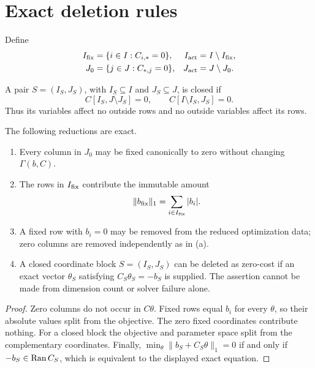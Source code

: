 \section{Exact deletion rules}
\label{sec:deletion}

Define
\begin{align*}
 I_{\rm fix}
 &=
 \{i\in I:C_{i,*}=0\},&
 I_{\rm act}
 &=
 I\setminus I_{\rm fix},\\
 J_0
 &=
 \{j\in J:C_{*,j}=0\},&
 J_{\rm act}
 &=
 J\setminus J_0.
\end{align*}

\begin{definition}
A pair \(S=(I_S,J_S)\), with \(I_S\subseteq I\) and
\(J_S\subseteq J\), is closed if
\[
 C[I_S,J\setminus J_S]=0,
 \qquad
 C[I\setminus I_S,J_S]=0.
\]
Thus its variables affect no outside rows and no outside variables
affect its rows.
\end{definition}

\begin{theorem}
\label{thm:deletion}
The following reductions are exact.
\begin{enumerate}[label=\textup{(\alph*)},leftmargin=2.5em]
 \item Every column in \(J_0\) may be fixed canonically to zero without
       changing \(\Gamma(b,C)\).
 \item The rows in \(I_{\rm fix}\) contribute the immutable amount
       \[
       \|b_{\rm fix}\|_1
       =
       \sum_{i\in I_{\rm fix}}|b_i|.
       \]
 \item A fixed row with \(b_i=0\) may be removed from the reduced
       optimization data; zero columns are removed independently as in
       \textup{(a)}.
 \item A closed coordinate block \(S=(I_S,J_S)\) can be deleted as
       zero-cost if an exact vector \(\theta_S\) satisfying
       \(C_S\theta_S=-b_S\) is supplied. The assertion cannot be made
       from dimension count or solver failure alone.
\end{enumerate}
\end{theorem}

\begin{proof}
Zero columns do not occur in \(C\theta\). Fixed rows equal \(b_i\) for
every \(\theta\), so their absolute values split from the objective.
The zero fixed coordinates contribute nothing. For a closed block the
objective and parameter space split from the complementary coordinates.
Finally,
\(\min_\theta\|b_S+C_S\theta\|_1=0\) if and only if
\(-b_S\in\operatorname{Ran} C_S\), which is equivalent to the displayed exact
equation.
\end{proof}

